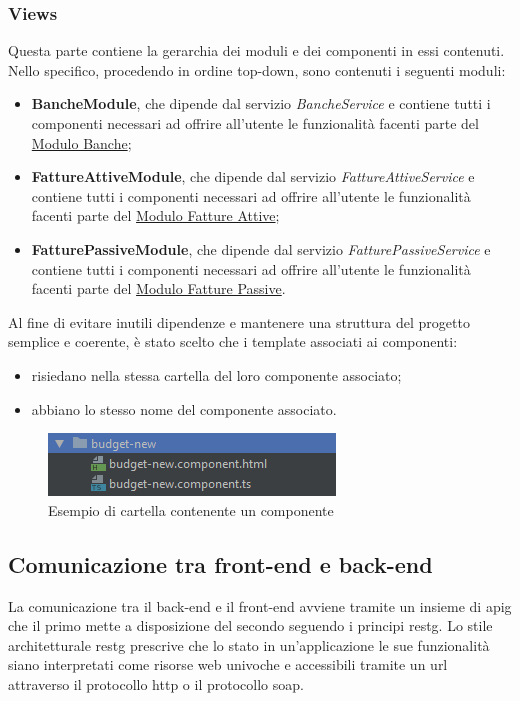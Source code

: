 	\subsubsection{Views}
	Questa parte contiene la gerarchia dei moduli e dei componenti in essi contenuti.\\
	Nello specifico, procedendo in ordine top-down, sono contenuti i seguenti moduli:
	\begin{itemize}
		\item \textbf{BancheModule}, che dipende dal servizio \emph{BancheService} e contiene tutti i componenti necessari ad offrire all'utente le funzionalità facenti parte del \hyperref[mod:banche]{Modulo Banche};
		\item \textbf{FattureAttiveModule}, che dipende dal servizio \emph{FattureAttiveService} e contiene tutti i componenti necessari ad offrire all'utente le funzionalità facenti parte del \hyperref[mod:fa]{Modulo Fatture Attive};
		\item \textbf{FatturePassiveModule}, che dipende dal servizio \emph{FatturePassiveService} e contiene tutti i componenti necessari ad offrire all'utente le funzionalità facenti parte del \hyperref[mod:fp]{Modulo Fatture Passive}.
	\end{itemize}
	
	Al fine di evitare inutili dipendenze e mantenere una struttura del progetto semplice e coerente, è stato scelto che i template associati ai componenti:
	\begin{itemize}
		\item risiedano nella stessa cartella del loro componente associato;
		\item abbiano lo stesso nome del componente associato.
	\end{itemize}
	
	\begin{figure}[H]
		\centering
		\includegraphics[width=0.4\linewidth]{immagini/angular-comp}
		\caption{Esempio di cartella contenente un componente}
		\label{fig:angular-arch}
	\end{figure}
	
	\subsection{Comunicazione tra front-end e back-end}
La comunicazione tra il back-end e il front-end avviene tramite un insieme di \gls{apig} che
il primo mette a disposizione del secondo seguendo i principi \gls{restg}.
Lo stile architetturale \gls{restg} prescrive che lo stato in un’applicazione le sue funzionalità
siano interpretati come risorse web univoche e accessibili tramite un \gls{url} attraverso il protocollo \gls{http} o il protocollo \gls{soap}.
\\ \\

